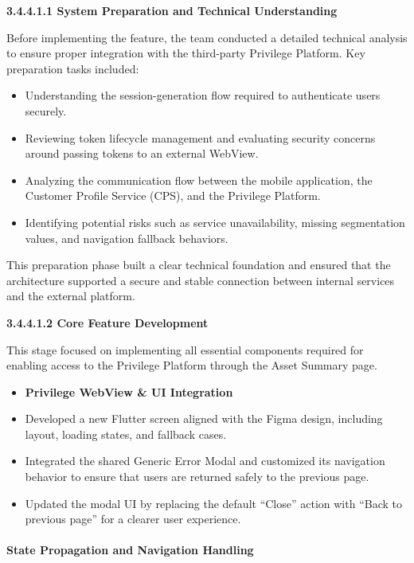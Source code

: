\textbf{3.4.4.1.1 System Preparation and Technical Understanding}

Before implementing the feature, the team conducted a detailed technical
analysis to ensure proper integration with the third-party Privilege
Platform. Key preparation tasks included:

\begin{itemize}
\item
  Understanding the session-generation flow required to authenticate
  users securely.
\item
  Reviewing token lifecycle management and evaluating security concerns
  around passing tokens to an external WebView.
\item
  Analyzing the communication flow between the mobile application, the
  Customer Profile Service (CPS), and the Privilege Platform.
\item
  Identifying potential risks such as service unavailability, missing
  segmentation values, and navigation fallback behaviors.
\end{itemize}

This preparation phase built a clear technical foundation and ensured
that the architecture supported a secure and stable connection between
internal services and the external platform.

\textbf{3.4.4.1.2 Core Feature Development}

This stage focused on implementing all essential components required for
enabling access to the Privilege Platform through the Asset Summary
page.

\begin{itemize}
\item
  \textbf{Privilege WebView \& UI Integration}
\end{itemize}

\begin{itemize}
\item
  Developed a new Flutter screen aligned with the Figma design,
  including layout, loading states, and fallback cases.
\item
  Integrated the shared Generic Error Modal and customized its
  navigation behavior to ensure that users are returned safely to the
  previous page.
\item
  Updated the modal UI by replacing the default ``Close'' action with
  ``Back to previous page'' for a clearer user experience.
\end{itemize}

\paragraph{\texorpdfstring{\textbf{State Propagation and Navigation
Handling}}{State Propagation and Navigation Handling}}\label{state-propagation-and-navigation-handling}


